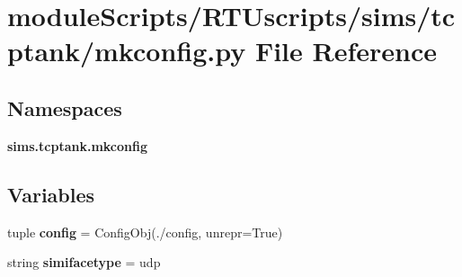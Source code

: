 \section{module\+Scripts/\+R\+T\+Uscripts/sims/tcptank/mkconfig.py File Reference}
\label{tcptank_2mkconfig_8py}
\subsection*{Namespaces}
\begin{DoxyCompactItemize}
\item 
 {\bf sims.\+tcptank.\+mkconfig}
\end{DoxyCompactItemize}
\subsection*{Variables}
\begin{DoxyCompactItemize}
\item 
tuple {\bf config} = Config\+Obj(\textquotesingle{}./config\textquotesingle{}, unrepr=True)
\item 
string {\bf simifacetype} = \textquotesingle{}udp\textquotesingle{}
\end{DoxyCompactItemize}

